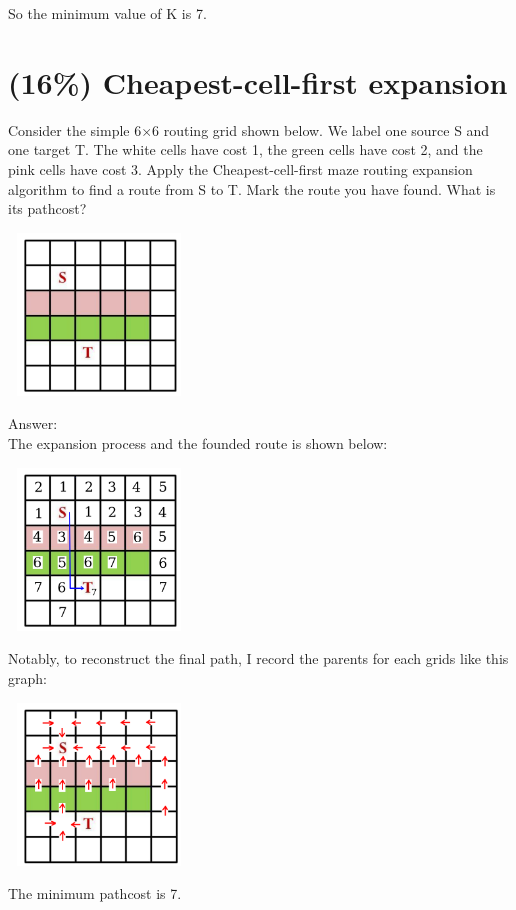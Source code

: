 \documentclass[12pt]{article}
\begin{document}
        So the minimum value of K is 7.


    \section{(16\%) Cheapest-cell-first expansion}

        Consider the simple 6$\times$6 routing grid shown below. We label one source S and one
        target T. The white cells have cost 1, the green cells have cost 2, and the pink cells
        have cost 3. Apply the Cheapest-cell-first maze routing expansion algorithm to find a
        route from S to T. Mark the route you have found. What is its pathcost?

        \begin{center}
            \includegraphics[width = 1.90in, height = 1.70in]{figure14.png}
        \end{center}

        \noindent
        Answer:\\

        The expansion process and the founded route is shown below:

        \begin{center}
            \includegraphics[width = 1.90in, height = 1.70in]{figure15.png}
        \end{center}

        Notably, to reconstruct the final path, I record the parents for each grids like this
        graph:

        \begin{center}
            \includegraphics[width = 1.90in, height = 1.70in]{figure16.png}
        \end{center}

        The minimum pathcost is 7.
\end{document}
